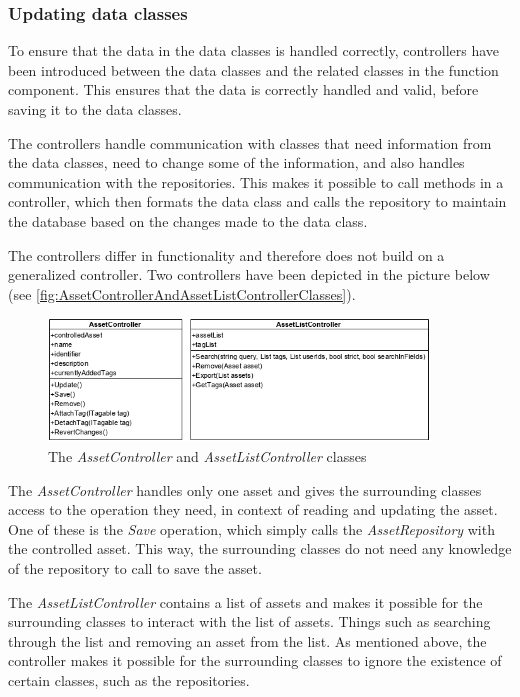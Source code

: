\subsubsection{Updating data classes}
To ensure that the data in the data classes is handled correctly, controllers have been introduced between the data classes and the related classes in the function component. This ensures that the data is correctly handled and valid, before saving it to the data classes.
\par
The controllers handle communication with classes that need information from the data classes, need to change some of the information, and also handles communication with the repositories. This makes it possible to call methods in a controller, which then formats the data class and calls the repository to maintain the database based on the changes made to the data class.
\par
The controllers differ in functionality and therefore does not build on a generalized controller. Two controllers have been depicted in the picture below (see \autoref{fig:AssetControllerAndAssetListControllerClasses}).

\begin{figure}[H]
    \centering
    \includegraphics[width=0.9\textwidth]{figures/FunctionComponent/AssetControllerAndAssetListController.png}
    \caption{The \textit{AssetController} and \textit{AssetListController} classes}
    \label{fig:AssetControllerAndAssetListControllerClasses}
\end{figure}

The \textit{AssetController} handles only one asset and gives the surrounding classes access to the operation they need, in context of reading and updating the asset. One of these is the \textit{Save} operation, which simply calls the \textit{AssetRepository} with the controlled asset. This way, the surrounding classes do not need any knowledge of the repository to call to save the asset.
\par
The \textit{AssetListController} contains a list of assets and makes it possible for the surrounding classes to interact with the list of assets. Things such as searching through the list and removing an asset from the list. As mentioned above, the controller makes it possible for the surrounding classes to ignore the existence of certain classes, such as the repositories.

